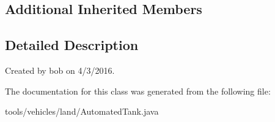 \subsection*{Additional Inherited Members}


\subsection{Detailed Description}
Created by bob on 4/3/2016. 

The documentation for this class was generated from the following file\+:\begin{DoxyCompactItemize}
\item 
tools/vehicles/land/Automated\+Tank.\+java\end{DoxyCompactItemize}
